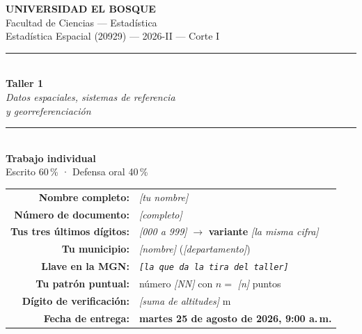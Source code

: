 \documentclass[11pt,a4paper,oneside]{article}
\newcommand{\marcador}[1]{\textcolor{grismarcador}{\textit{[#1]}}}
\begin{document}
\thispagestyle{empty}
\begin{center}

{\large\textbf{UNIVERSIDAD EL BOSQUE}}\\[0.15cm]
{\normalsize Facultad de Ciencias --- Estadística}\\[0.1cm]
{\normalsize Estadística Espacial (20929) --- 2026-II --- Corte I}\\[0.9cm]

\rule{\textwidth}{1.2pt}\\[0.25cm]
{\LARGE\textbf{Taller 1}}\\[0.15cm]
{\large\textit{Datos espaciales, sistemas de referencia\\ y georreferenciación}}\\[0.25cm]
\rule{\textwidth}{1.2pt}\\[0.9cm]

{\large\textbf{Trabajo individual}}\\[0.15cm]
{\normalsize Escrito 60\,\% \quad · \quad Defensa oral 40\,\%}\\[1.0cm]

\end{center}

\begin{tabular}{rl}
\textbf{Nombre completo:}          & \marcador{tu nombre} \\[0.25cm]
\textbf{Número de documento:}      & \marcador{completo} \\[0.25cm]
\textbf{Tus tres últimos dígitos:} & \marcador{000 a 999} \quad $\rightarrow$ \quad
                                     \textbf{variante} \marcador{la misma cifra} \\[0.25cm]
\textbf{Tu municipio:}             & \marcador{nombre} (\marcador{departamento}) \\[0.25cm]
\textbf{Llave en la MGN:}          & \texttt{\marcador{la que da la tira del taller}} \\[0.25cm]
\textbf{Tu patrón puntual:}        & número \marcador{NN} \quad con $n =$ \marcador{n} puntos \\[0.25cm]
\textbf{Dígito de verificación:}   & \marcador{suma de altitudes} m \\[0.25cm]
\textbf{Fecha de entrega:}         & \textbf{martes 25 de agosto de 2026, 9:00 a.\,m.} \\
\end{tabular}
\end{document}
